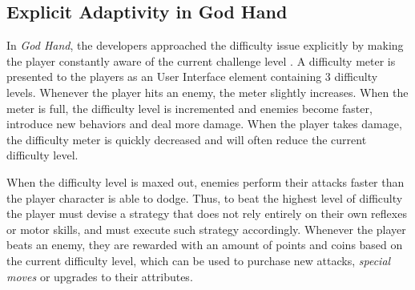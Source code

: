 
\subsection{Explicit Adaptivity in God Hand}



In \emph{God Hand}, the developers approached the difficulty issue explicitly by making the player constantly aware of the current challenge level \cite{article_subjectivedifficulty}. A difficulty meter is presented to the players as an User Interface element containing 3 difficulty levels. Whenever the player hits an enemy, the meter slightly increases. When the meter is full, the difficulty level is incremented and enemies become faster, introduce new behaviors and deal more damage. When the player takes damage, the difficulty meter is quickly decreased and will often reduce the current difficulty level.

When the difficulty level is maxed out, enemies perform their attacks faster than the player character is able to dodge. Thus, to beat the highest level of difficulty the player must devise a strategy that does not rely entirely on their own reflexes or motor skills, and must execute such strategy accordingly. Whenever the player beats an enemy, they are rewarded with an amount of points and coins based on the current difficulty level, which can be used to purchase new attacks, \emph{special moves} or upgrades to their attributes.



